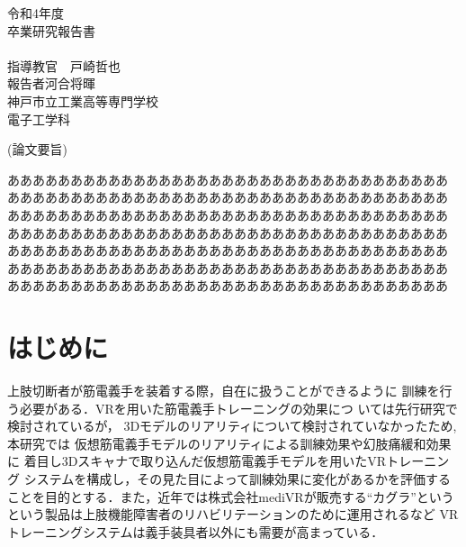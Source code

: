 \documentclass{ltjsreport}
\begin{document}
\begin{titlepage}
\begin{center}
\large 令和4年度\\
\vspace{30pt}
\large 卒業研究報告書\\
\vspace{50pt}
\Large{}\\
\vspace{80pt}
\large 指導教官　戸崎哲也\\
\large 報告者\hspace{23pt}河合将暉\\
\vspace{30pt}
\large 神戸市立工業高等専門学校\\
\large 電子工学科
\end{center}
\end{titlepage}
\clearpage

\begin{center}
\large (論文要旨)
\end{center}
あああああああああああああああああああああああああああああああああああ
あああああああああああああああああああああああああああああああああああ
あああああああああああああああああああああああああああああああああああ
あああああああああああああああああああああああああああああああああああ
あああああああああああああああああああああああああああああああああああ
あああああああああああああああああああああああああああああああああああ
あああああああああああああああああああああああああああああああああああ

\clearpage
\setcounter{tocdepth}{3}
\tableofcontents

\setcounter{page}{1}
\chapter{はじめに}
	上肢切断者が筋電義手を装着する際，自在に扱うことができるように
	訓練を行う必要がある．VRを用いた筋電義手トレーニングの効果につ
	いては先行研究\cite{ref:1}\cite{ref:2}で検討されているが，
	3Dモデルのリアリティについて検討されていなかったため, 本研究では
	仮想筋電義手モデルのリアリティによる訓練効果や幻肢痛緩和効果に
	着目し3Dスキャナで取り込んだ仮想筋電義手モデルを用いたVRトレーニング
	システムを構成し，その見た目によって訓練効果に変化があるかを評価する
	ことを目的とする．また，近年では株式会社mediVRが販売する``カグラ''という
	という製品は上肢機能障害者のリハビリテーションのために運用されるなど
	VRトレーニングシステムは義手装具者以外にも需要が高まっている．
\end{document}
